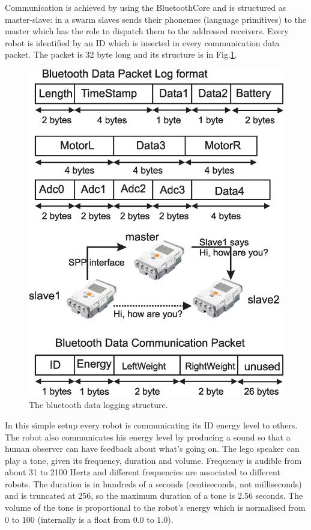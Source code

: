 Communication is achieved by using the BluetoothCore and is structured as master-slave:
in a swarm slaves sends their phonemes (language primitives) to the master which has the role to dispatch them to the addressed receivers.
Every robot is identified by an ID which is inserted in every communication data packet. The packet is 32 byte long and its structure is in Fig.\ref{blue:communication}.
\begin{figure}[htbp]
\begin{center}
\includegraphics[scale=0.4]{figures/nxtosek/bluetoothlog.eps}
\caption{The bluetooth data logging structure.\label{blue:communication}}
\end{center}
\end{figure}
In this simple setup every robot is communicating its ID energy level to others.
The robot also communicates his energy level by producing a sound so that a human observer can have feedback about what's going on.
The lego speaker can play a tone, given its frequency, duration and volume. Frequency is audible from about 31 to 2100 Hertz and different frequencies are associated to different robots. The duration is in hundreds of a seconds (centiseconds, not milliseconds) and is truncated at 256, so the maximum duration of a tone is 2.56 seconds. The volume of the tone is proportional to the robot's energy which is normalised from 0 to 100 (internally is a float from 0.0 to 1.0).

